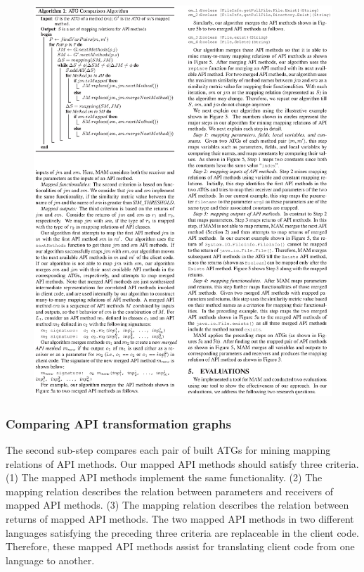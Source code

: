 \begin{figure}[t]
\centering
\includegraphics[scale=1,clip]{figure/algorithm2.eps}
\vspace*{-7ex}
\end{figure}

\subsubsection{Comparing API transformation graphs}

The second sub-step compares each pair of built ATGs for mining
mapping relations of API methods. Our mapped API methods should satisfy
three criteria. (1) The mapped API methods implement the same
functionality. (2) The mapping relation describes the relation between
parameters and receivers of mapped API methods. (3) The mapping relation
describes the relation between returns of mapped API methods.
The two mapped API methods in two different languages satisfying the
preceding three criteria are replaceable in the client code.
Therefore, these mapped API methods assist for translating client
code from one language to another.

